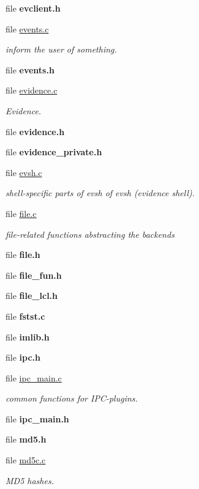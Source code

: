 \begin{CompactItemize}
\item 
file {\bf evclient.h}
\item 
file \hyperlink{events_8c}{events.c}
\begin{CompactList}\small\item\em inform the user of something. \item\end{CompactList}

\item 
file {\bf events.h}
\item 
file \hyperlink{evidence_8c}{evidence.c}
\begin{CompactList}\small\item\em Evidence. \item\end{CompactList}

\item 
file {\bf evidence.h}
\item 
file {\bf evidence\_\-private.h}
\item 
file \hyperlink{evsh_8c}{evsh.c}
\begin{CompactList}\small\item\em shell-specific parts of evsh of evsh (evidence shell). \item\end{CompactList}

\item 
file \hyperlink{file_8c}{file.c}
\begin{CompactList}\small\item\em file-related functions abstracting the backends \item\end{CompactList}

\item 
file {\bf file.h}
\item 
file {\bf file\_\-fun.h}
\item 
file {\bf file\_\-lcl.h}
\item 
file {\bf fstst.c}
\item 
file {\bf imlib.h}
\item 
file {\bf ipc.h}
\item 
file \hyperlink{ipc__main_8c}{ipc\_\-main.c}
\begin{CompactList}\small\item\em common functions for IPC-plugins. \item\end{CompactList}

\item 
file {\bf ipc\_\-main.h}
\item 
file {\bf md5.h}
\item 
file \hyperlink{md5c_8c}{md5c.c}
\begin{CompactList}\small\item\em MD5 hashes. \item\end{CompactList}


\end{CompactItemize}
